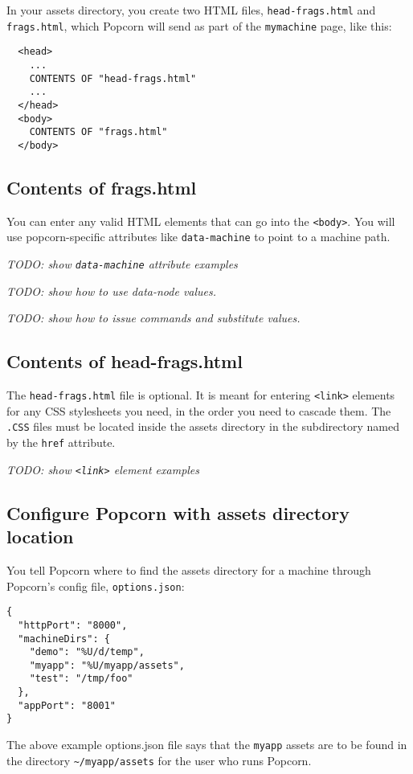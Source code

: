 \documentclass[12pt]{article}
\begin{document}
In your assets directory, you create two HTML files, \verb`head-frags.html`
and \verb`frags.html`, which Popcorn will send as part of the \verb`mymachine`
page, like this:

\begin{verbatim}
  <head>
    ...
    CONTENTS OF "head-frags.html"
    ...
  </head>
  <body>
    CONTENTS OF "frags.html"
  </body>
\end{verbatim}

\subsection{Contents of frags.html}

You can enter any valid HTML elements that can go into the
\verb`<body>`. You will use popcorn-specific attributes like \verb`data-machine`
to point to a machine path.

\em{TODO: show \verb`data-machine` attribute examples}

\em{TODO: show how to use data-node values.}

\em{TODO: show how to issue commands and substitute values.}


\subsection{Contents of head-frags.html}

The \verb`head-frags.html` file is optional. It is meant for entering
\verb`<link>` elements for any CSS stylesheets you need, in the order you
need to cascade them. The \verb`.CSS` files must be located inside the
assets directory in the subdirectory named by the \verb`href` attribute.

\em{TODO: show \verb`<link>` element examples}


\subsection{Configure Popcorn with assets directory location}

You tell Popcorn where to find the assets directory for a machine
through Popcorn's config file, \verb`options.json`:

\begin{verbatim}
{
  "httpPort": "8000",
  "machineDirs": {
    "demo": "%U/d/temp",
    "myapp": "%U/myapp/assets",
    "test": "/tmp/foo"
  },
  "appPort": "8001"
}
\end{verbatim}

The above example options.json file says that the \verb`myapp` assets are
to be found in the directory \verb`~/myapp/assets` for the user who runs
Popcorn.
\end{document}

